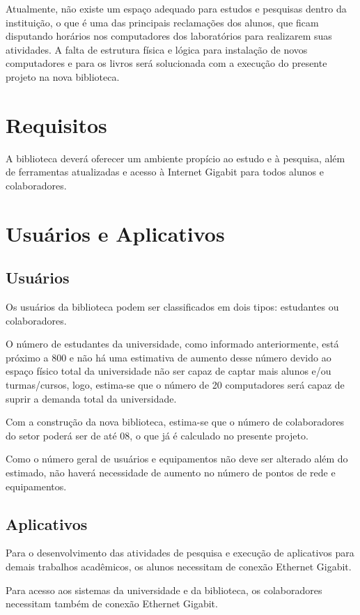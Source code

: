 \documentclass[	DIV=calc,%
							paper=a4,%
							fontsize=12pt,%
							onecolumn]{scrartcl}	 					%
\begin{document}
Atualmente, não existe um espaço adequado para estudos e pesquisas dentro da instituição, o que é uma das principais reclamações dos alunos, que ficam disputando horários nos computadores dos laboratórios para realizarem suas atividades. A falta de estrutura física e lógica para instalação de novos computadores e para os livros será solucionada com a execução do presente projeto na nova biblioteca.

\section{Requisitos}
A biblioteca deverá oferecer um ambiente propício ao estudo e à pesquisa, além de ferramentas atualizadas e acesso à Internet Gigabit para todos alunos e colaboradores.

\section{Usuários e Aplicativos}
 
\subsection{Usuários}
Os usuários da biblioteca podem ser classificados em dois tipos: estudantes ou colaboradores.

O número de estudantes da universidade, como informado anteriormente, está próximo a 800 e não há uma estimativa de aumento desse número devido ao espaço físico total da universidade não ser capaz de captar mais alunos e/ou turmas/cursos, logo, estima-se que o número de 20 computadores será capaz de suprir a demanda total da universidade.

Com a construção da nova biblioteca, estima-se que o número de colaboradores do setor poderá ser de até 08, o que já é calculado no presente projeto.

Como o número geral de usuários e equipamentos não deve ser alterado além do estimado, não haverá necessidade de aumento no número de pontos de rede e equipamentos. 

\subsection{Aplicativos}
Para o desenvolvimento das atividades de pesquisa e execução de aplicativos para demais trabalhos acadêmicos, os alunos necessitam de conexão Ethernet Gigabit.

Para acesso aos sistemas da universidade e da biblioteca, os colaboradores necessitam também de conexão Ethernet Gigabit.
\end{document}
